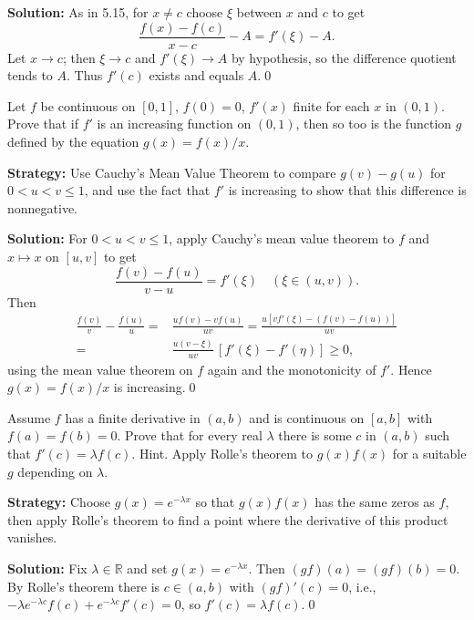 \bigskip\noindent\textbf{Solution:}
As in 5.15, for $x\ne c$ choose $\xi$ between $x$ and $c$ to get
\[\frac{f(x)-f(c)}{x-c}-A=f'(\xi)-A.\]
Let $x\to c$; then $\xi\to c$ and $f'(\xi)\to A$ by hypothesis, so the difference quotient tends to $A$. Thus $f'(c)$ exists and equals $A$.\qed


\begin{problembox}
Let \( f \) be continuous on \( [0, 1] \), \( f(0) = 0 \), \( f'(x) \) finite for each \( x \) in \( (0, 1) \). Prove that if \( f' \) is an increasing function on \( (0, 1) \), then so too is the function \( g \) defined by the equation \( g(x) = f(x)/x \).
\end{problembox}

\noindent\textbf{Strategy:} Use Cauchy's Mean Value Theorem to compare \( g(v) - g(u) \) for \( 0 < u < v \leq 1 \), and use the fact that \( f' \) is increasing to show that this difference is nonnegative.

\bigskip\noindent\textbf{Solution:}
For $0<u<v\le 1$, apply Cauchy's mean value theorem to $f$ and $x\mapsto x$ on $[u,v]$ to get
\[\frac{f(v)-f(u)}{v-u}=f'(\xi)\quad(\xi\in(u,v)).\]
Then
\begin{align*}
\frac{f(v)}{v}-\frac{f(u)}{u}=&\frac{uf(v)-vf(u)}{uv}=\frac{u[v f'(\xi)-(f(v)-f(u))]}{uv} \\
=& \frac{u(v-\xi)}{uv}\,[f'(\xi)-f'(\eta)]\ge 0,
\end{align*}
using the mean value theorem on $f$ again and the monotonicity of $f'$. Hence $g(x)=f(x)/x$ is increasing.\qed


\begin{problembox}
Assume \( f \) has a finite derivative in \( (a, b) \) and is continuous on \( [a, b] \) with \( f(a) = f(b) = 0 \). Prove that for every real \( \lambda \) there is some \( c \) in \( (a, b) \) such that \( f'(c) = \lambda f(c) \). Hint. Apply Rolle's theorem to \( g(x)f(x) \) for a suitable \( g \) depending on \( \lambda \).
\end{problembox}

\noindent\textbf{Strategy:} Choose \( g(x) = e^{-\lambda x} \) so that \( g(x)f(x) \) has the same zeros as \( f \), then apply Rolle's theorem to find a point where the derivative of this product vanishes.

\bigskip\noindent\textbf{Solution:}
Fix $\lambda\in\mathbb{R}$ and set $g(x)=e^{-\lambda x}$. Then $(gf)(a)=(gf)(b)=0$. By Rolle's theorem there is $c\in(a,b)$ with $(gf)'(c)=0$, i.e., $-\lambda e^{-\lambda c}f(c)+e^{-\lambda c}f'(c)=0$, so $f'(c)=\lambda f(c)$.\qed


